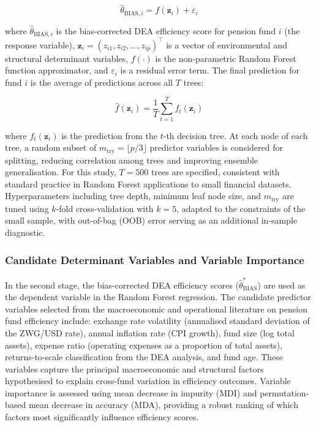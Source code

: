 \documentclass[12pt,a4paper]{article}
\begin{document}
\begin{equation}
    \hat{\theta}_{\text{BIAS},i} = f(\mathbf{z}_i) + \varepsilon_i
\end{equation}

where $\hat{\theta}_{\text{BIAS},i}$ is the bias-corrected DEA efficiency score for pension fund $i$ (the response variable), $\mathbf{z}_i = (z_{i1}, z_{i2}, \ldots, z_{ip})^{\top}$ is a vector of environmental and structural determinant variables, $f(\cdot)$ is the non-parametric Random Forest function approximator, and $\varepsilon_i$ is a residual error term. The final prediction for fund $i$ is the average of predictions across all $T$ trees:

\begin{equation}
    \hat{f}(\mathbf{z}_i) = \frac{1}{T} \sum_{t=1}^{T} f_t(\mathbf{z}_i)
\end{equation}

where $f_t(\mathbf{z}_i)$ is the prediction from the $t$-th decision tree. At each node of each tree, a random subset of $m_{\text{try}} = \lfloor p/3 \rfloor$ predictor variables is considered for splitting, reducing correlation among trees and improving ensemble generalisation. For this study, $T = 500$ trees are specified, consistent with standard practice in Random Forest applications to small financial datasets. Hyperparameters including tree depth, minimum leaf node size, and $m_{\text{try}}$ are tuned using $k$-fold cross-validation with $k = 5$, adapted to the constraints of the small sample, with out-of-bag (OOB) error serving as an additional in-sample diagnostic.

\subsubsection{Candidate Determinant Variables and Variable Importance}

In the second stage, the bias-corrected DEA efficiency scores ($\hat{\theta}^*_{\text{BIAS}}$) are used as the dependent variable in the Random Forest regression. The candidate predictor variables selected from the macroeconomic and operational literature on pension fund efficiency include: exchange rate volatility (annualised standard deviation of the ZWG/USD rate), annual inflation rate (CPI growth), fund size (log total assets), expense ratio (operating expenses as a proportion of total assets), returns-to-scale classification from the DEA analysis, and fund age. These variables capture the principal macroeconomic and structural factors hypothesised to explain cross-fund variation in efficiency outcomes. Variable importance is assessed using mean decrease in impurity (MDI) and permutation-based mean decrease in accuracy (MDA), providing a robust ranking of which factors most significantly influence efficiency scores.
\end{document}
